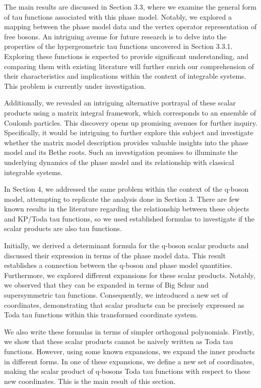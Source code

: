 \documentclass[a4paper,11pt]{amsart}
\begin{document}
The main results are discussed in Section 3.3, where we examine the
general form of tau functions associated with this phase model.
Notably, we explored a mapping between the phase model
data and the vertex operator representation of free bosons. An
intriguing avenue for future research is to delve into the properties
of the hypergeometric tau functions uncovered in Section 3.3.1.
Exploring these functions is expected to provide significant
understanding, and comparing them with existing literature will
further enrich our comprehension of their characteristics and
implications within the context of integrable systems. This problem is
currently under investigation. 

Additionally, we revealed an intriguing alternative portrayal of these
scalar products using a matrix integral framework, which corresponds
to an ensemble of Coulomb particles. This discovery opens up promising
avenues for further inquiry. Specifically, it would be intriguing to
further explore this subject and investigate whether the matrix model
description provides valuable insights into the phase model and its
Bethe roots. Such an investigation promises to illuminate the
underlying dynamics of the phase model and its relationship with
classical integrable systems.

In Section 4, we addressed the same problem within the context of the
q-boson model, attempting to replicate the analysis done in Section
3. There are few known results in the literature regarding the
relationship between these objects and KP/Toda tau functions, so we
used established formulas to investigate if the scalar products are
also tau functions.

Initially, we derived a determinant formula for the q-boson scalar
products and discussed their expression in terms of the phase model
data. This result establishes a connection between the q-boson and
phase model quantities. Furthermore, we explored different expansions
for these scalar products. Notably, we observed that they can be
expanded in terms of Big Schur and supersymmetric tau
functions. Consequently, we introduced a new set of coordinates,
demonstrating that scalar products can be precisely expressed as Toda
tau functions within this transformed coordinate system.

We also write these formulas in terms of simpler orthogonal
polynomials. Firstly, we show that these scalar products cannot be
naively written as Toda tau functions. However, using some known
expansions, we expand the inner products in different forms. In one
of these expansions, we define a new set of coordinates, making the
scalar product of q-bosons Toda tau functions with respect to these
new coordinates. This is the main result of this section.
\end{document}
